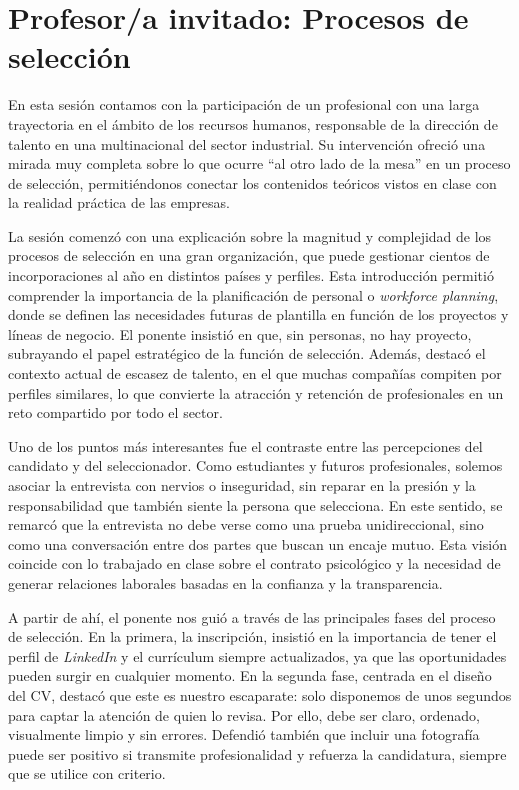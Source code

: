 \chapter{Profesor/a invitado: Procesos de selección}

En esta sesión contamos con la participación de un profesional con una larga trayectoria en el ámbito de los recursos humanos, responsable de la dirección de talento en una multinacional del sector industrial. Su intervención ofreció una mirada muy completa sobre lo que ocurre “al otro lado de la mesa” en un proceso de selección, permitiéndonos conectar los contenidos teóricos vistos en clase con la realidad práctica de las empresas. 

La sesión comenzó con una explicación sobre la magnitud y complejidad de los procesos de selección en una gran organización, que puede gestionar cientos de incorporaciones al año en distintos países y perfiles. Esta introducción permitió comprender la importancia de la planificación de personal o \textit{workforce planning}, donde se definen las necesidades futuras de plantilla en función de los proyectos y líneas de negocio. El ponente insistió en que, sin personas, no hay proyecto, subrayando el papel estratégico de la función de selección. Además, destacó el contexto actual de escasez de talento, en el que muchas compañías compiten por perfiles similares, lo que convierte la atracción y retención de profesionales en un reto compartido por todo el sector.  

Uno de los puntos más interesantes fue el contraste entre las percepciones del candidato y del seleccionador. Como estudiantes y futuros profesionales, solemos asociar la entrevista con nervios o inseguridad, sin reparar en la presión y la responsabilidad que también siente la persona que selecciona. En este sentido, se remarcó que la entrevista no debe verse como una prueba unidireccional, sino como una conversación entre dos partes que buscan un encaje mutuo. Esta visión coincide con lo trabajado en clase sobre el contrato psicológico y la necesidad de generar relaciones laborales basadas en la confianza y la transparencia.  

A partir de ahí, el ponente nos guió a través de las principales fases del proceso de selección. En la primera, la inscripción, insistió en la importancia de tener el perfil de \textit{LinkedIn} y el currículum siempre actualizados, ya que las oportunidades pueden surgir en cualquier momento. En la segunda fase, centrada en el diseño del CV, destacó que este es nuestro escaparate: solo disponemos de unos segundos para captar la atención de quien lo revisa. Por ello, debe ser claro, ordenado, visualmente limpio y sin errores. Defendió también que incluir una fotografía puede ser positivo si transmite profesionalidad y refuerza la candidatura, siempre que se utilice con criterio.  

